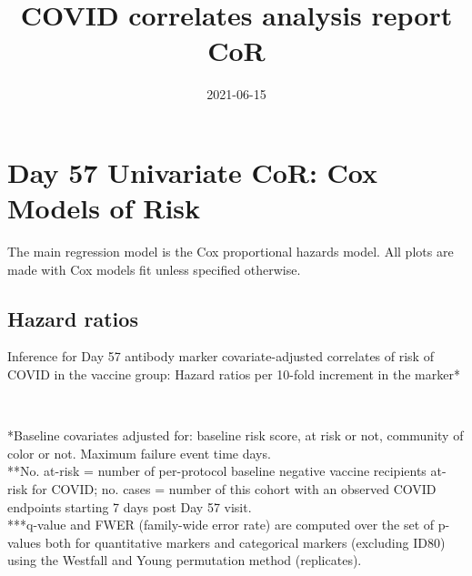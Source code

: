 \documentclass[
]{article}
\title{COVID correlates analysis report CoR}
\author{}
\date{\vspace{-2.5em}2021-06-15}
\begin{document}
\maketitle


\newif\ifENSEMBLE

\hypertarget{cor-coxph-Day57}{%
\section{Day 57 Univariate CoR: Cox Models of Risk}\label{cor-coxph-Day57}}

The main regression model is the Cox proportional hazards model. All plots are made with Cox models fit unless specified otherwise.

\hypertarget{hazard-ratios}{%
\subsection{Hazard ratios}\label{hazard-ratios}}

\begin{table}[H]
\caption{Inference for Day 57 antibody marker covariate-adjusted correlates of risk of COVID in the vaccine group: Hazard ratios per 10-fold increment in the marker*}
\begin{center}
    \\
\end{center}
*Baseline covariates adjusted for: baseline risk score, at risk or not, community of color or not. Maximum failure event time  days.\\
**No. at-risk = number of per-protocol baseline negative vaccine recipients at-risk for COVID; no. cases = number of this cohort with an observed COVID endpoints starting 7 days post Day 57 visit.\\
***q-value and FWER (family-wide error rate) are computed over the set of p-values both for quantitative markers and categorical markers (excluding ID80) using the Westfall and Young permutation method (\protect replicates). 

\end{table}
\end{document}
